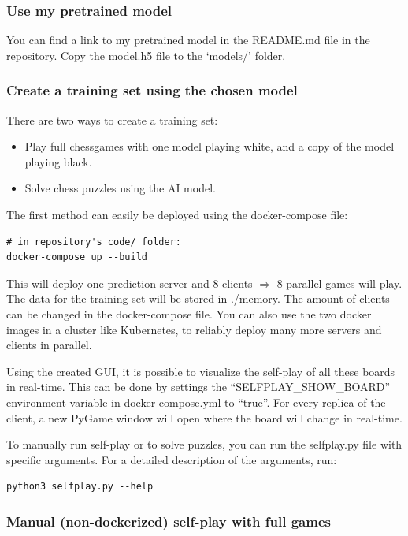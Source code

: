 \documentclass{article}
\begin{document}
\subsubsection{Use my pretrained model}

You can find a link to my pretrained model in the README.md file in the repository.
Copy the model.h5 file to the `models/' folder.

\subsubsection{Create a training set using the chosen model}

There are two ways to create a training set:

\begin{itemize}
	\item Play full chessgames with one model playing white, and a copy of the model playing black.
	\item Solve chess puzzles using the AI model.
\end{itemize}

The first method can easily be deployed using the docker-compose file:

\begin{verbatim}
# in repository's code/ folder:
docker-compose up --build
\end{verbatim}

This will deploy one prediction server and 8 clients $\Rightarrow$ 8 parallel games will play. 
The data for the training set will be stored in ./memory.
The amount of clients can be changed in the docker-compose file. 
You can also use the two docker images in a cluster like Kubernetes, to
reliably deploy many more servers and clients in parallel.

Using the created GUI, it is possible to visualize the self-play of all these boards in real-time.
This can be done by settings the ``SELFPLAY\_SHOW\_BOARD'' environment variable in docker-compose.yml to ``true''.
For every replica of the client, a new PyGame window will open where the board will change in real-time. 

To manually run self-play or to solve puzzles, you can run the selfplay.py file 
with specific arguments. For a detailed description of the arguments, run:

\begin{verbatim}
python3 selfplay.py --help
\end{verbatim}

\subsubsection{Manual (non-dockerized) self-play with full games}
\end{document}
